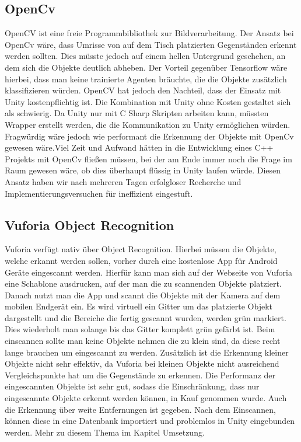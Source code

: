 \subsection{OpenCv}
OpenCV ist eine freie Programmbibliothek zur Bildverarbeitung. Der Ansatz bei OpenCv wäre, dass Umrisse von auf dem Tisch platzierten Gegenständen erkennt werden sollten. Dies müsste jedoch auf einem hellen Untergrund geschehen, an dem sich die Objekte deutlich abheben. Der Vorteil gegenüber Tensorflow wäre hierbei, dass man keine trainierte Agenten bräuchte, die die Objekte zusätzlich klassifizieren würden. OpenCV hat jedoch den Nachteil, dass der Einsatz mit Unity kostenpflichtig ist. Die Kombination mit Unity ohne Kosten gestaltet sich als schwierig. Da Unity nur mit C Sharp Skripten arbeiten kann, müssten Wrapper erstellt werden, die die Kommunikation zu Unity ermöglichen würden. Fragwürdig wäre jedoch wie performant die Erkennung der Objekte mit OpenCv gewesen wäre.Viel Zeit und Aufwand hätten in die Entwicklung eines C++ Projekts mit OpenCv fließen müssen, bei der am Ende immer noch die Frage im Raum gewesen wäre, ob dies überhaupt flüssig in Unity laufen würde. Diesen Ansatz haben wir nach mehreren Tagen erfolgloser  Recherche und Implementierungsversuchen für ineffizient eingestuft. 

\subsection{Vuforia Object Recognition}
\label{sec:vufObjRec}
Vuforia verfügt nativ über Object Recognition. Hierbei müssen die Objekte, welche erkannt werden sollen, vorher durch eine kostenlose App für Android Geräte eingescannt werden. Hierfür kann man sich auf der Webseite von Vuforia eine Schablone ausdrucken, auf der man die zu scannenden Objekte platziert. Danach nutzt man die App und scannt die Objekte mit der Kamera auf dem mobilen Endgerät ein. Es wird virtuell ein Gitter um das platzierte Objekt dargestellt und die Bereiche die fertig gescannt wurden, werden grün markiert. Dies wiederholt man solange bis das Gitter komplett grün gefärbt ist.  Beim einscannen sollte man keine Objekte nehmen die zu klein sind, da diese recht lange brauchen um eingescannt zu werden. Zusätzlich ist die Erkennung kleiner Objekte nicht sehr effektiv, da Vuforia bei kleinen Objekte nicht ausreichend Vergleichspunkte hat um die Gegenstände zu erkennen. Die Performanz der eingescannten Objekte ist sehr gut, sodass die Einschränkung, dass nur eingescannte Objekte erkennt werden können, in Kauf genommen wurde. Auch die Erkennung über weite Entfernungen ist gegeben. Nach dem Einscannen, können diese in eine Datenbank importiert und problemlos in Unity eingebunden werden. Mehr zu diesem Thema im Kapitel Umsetzung.
